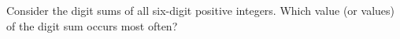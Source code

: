 Consider the digit sums of all six-digit positive integers. Which value (or values) of the digit sum occurs most often?
